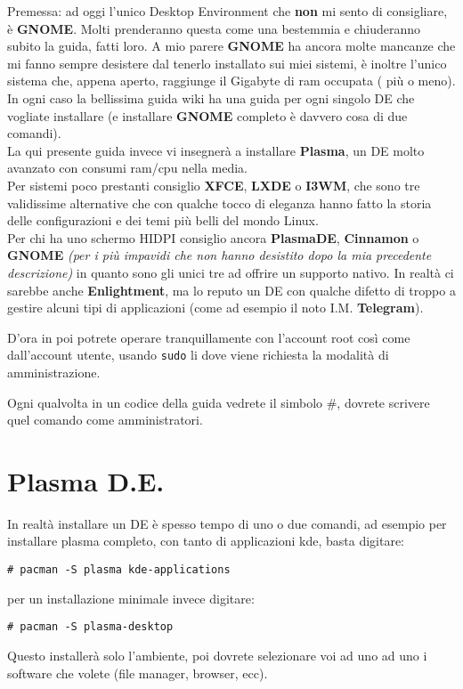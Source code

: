 \documentclass[twoside,italian]{book}
\newcommand{\nlinea}{
	\leavevmode
	\\
}
\newcommand{\centcode}[1]{
	
	\definecolor{centcode}{rgb}{0.5,0.1,0.1}
	
	\begin{center}
	 	\texttt{\textcolor{centcode}{#1}}
	\end{center}
	
	
}
\newcommand{\code}[1]{
	\texttt{\textcolor{code}{#1}}
}
\begin{document}
		Premessa: ad oggi l'unico Desktop Environment che \textbf{non} mi sento di consigliare, è \textbf{GNOME}. Molti prenderanno questa come una bestemmia e chiuderanno subito la guida, fatti loro. A mio parere \textbf{GNOME} ha ancora molte mancanze che mi fanno sempre desistere dal tenerlo installato sui miei sistemi, è inoltre l'unico sistema che, appena aperto, raggiunge il Gigabyte di ram occupata ( più o meno). In ogni caso la bellissima guida wiki ha una guida per ogni singolo DE che vogliate installare (e installare \textbf{GNOME} completo è davvero cosa di due comandi).\\
		La qui presente guida invece vi insegnerà a installare \textbf{Plasma}, un DE molto avanzato con consumi ram/cpu nella media.\\ Per sistemi poco prestanti consiglio \textbf{XFCE}, \textbf{LXDE} o \textbf{I3WM}, che sono tre validissime alternative che con qualche tocco di eleganza hanno fatto la storia delle configurazioni e dei temi più belli del mondo Linux.\\
		 Per chi ha uno schermo HIDPI consiglio ancora \textbf{PlasmaDE}, \textbf{Cinnamon} o \textbf{GNOME} \textit{(per i più impavidi che non hanno desistito dopo la mia precedente descrizione)} in quanto sono gli unici tre ad offrire un supporto nativo. In realtà ci sarebbe anche \textbf{Enlightment}, ma lo reputo un DE con qualche difetto di troppo a gestire alcuni tipi di applicazioni (come ad esempio il noto I.M. \textbf{Telegram}).
		 
		 \begin{tcolorbox}[floatplacement=b,width=\textwidth,colback={blue},title={NOTA BENE:},colbacktitle=gray,coltitle=white,colupper=white]
		 	D'ora in poi potrete operare tranquillamente con l'account root così come dall'account utente, usando \code{sudo} li dove viene richiesta la modalità di amministrazione.
		 	
		 	Ogni qualvolta in un codice della guida vedrete il simbolo \#, dovrete scrivere quel comando come amministratori.
		 \end{tcolorbox}
	
		 \section{Plasma D.E.}
	
		 	In realtà installare un DE è spesso tempo di uno o due comandi, ad esempio per installare plasma completo, con tanto di applicazioni kde, basta digitare:\\
		 	\centcode{\# pacman -S plasma kde-applications }
		 	per un installazione minimale invece digitare:\centcode{\# pacman -S plasma-desktop}Questo installerà solo l'ambiente, poi dovrete selezionare voi ad uno ad uno i software che volete (file manager, browser, ecc).\\
		 	\nlinea
	
\end{document}
